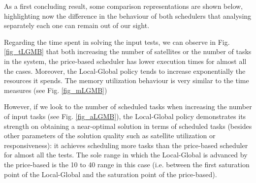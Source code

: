 As a first concluding result, some comparison representations are shown below, highlighting now the difference in the behaviour of both schedulers that analysing separately each one can remain out of our sight.

Regarding the time spent in solving the input tests, we can observe in Fig. \ref{fig_tLGMB} that both increasing the number of satellites or the number of tasks in the system, the price-based scheduler has lower execution times for almost all the cases. Moreover, the Local-Global policy tends to increase exponentially the resources it spends. The memory utilization behaviour is very similar to the time measures (see Fig. \ref{fig_mLGMB})

However, if we look to the number of scheduled tasks when increasing the number of input tasks (see Fig. \ref{fig_aLGMB}), the Local-Global policy demonstrates its strength on obtaining a near-optimal solution in terms of scheduled tasks (besides other parameters of the solution quality such as satellite utilization or responsiveness): it achieves scheduling more tasks than the price-based scheduler for almost all the tests. The sole range in which the Local-Global is advanced by the price-based is the 10 to 40 range in this case (i.e. between the first saturation point of the Local-Global and the saturation point of the price-based).

